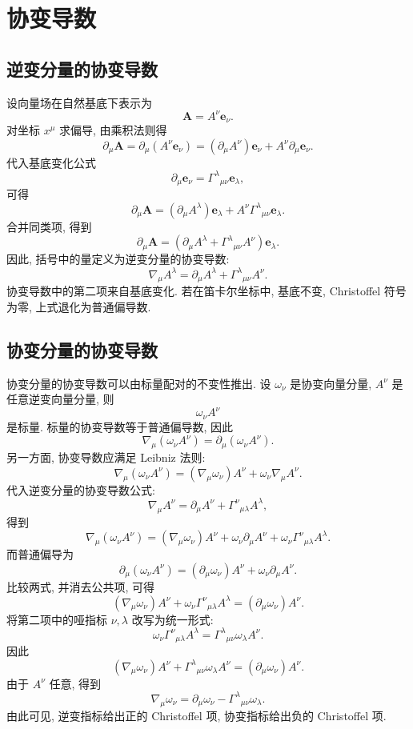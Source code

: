 \section{协变导数}

\subsection{逆变分量的协变导数}

设向量场在自然基底下表示为
\[
\bm{A}
=
A^{\nu}\bm{e}_{\nu}.
\]
对坐标 $x^{\mu}$ 求偏导, 由乘积法则得
\[
\partial_{\mu}\bm{A}
=
\partial_{\mu}(A^{\nu}\bm{e}_{\nu})
=
(\partial_{\mu}A^{\nu})\bm{e}_{\nu}
+
A^{\nu}\partial_{\mu}\bm{e}_{\nu}.
\]
代入基底变化公式
\[
\partial_{\mu}\bm{e}_{\nu}
=
\Gamma^{\lambda}{}_{\mu\nu}\bm{e}_{\lambda},
\]
可得
\[
\partial_{\mu}\bm{A}
=
(\partial_{\mu}A^{\lambda})\bm{e}_{\lambda}
+
A^{\nu}\Gamma^{\lambda}{}_{\mu\nu}\bm{e}_{\lambda}.
\]
合并同类项, 得到
\[
\partial_{\mu}\bm{A}
=
\left(
\partial_{\mu}A^{\lambda}
+
\Gamma^{\lambda}{}_{\mu\nu}A^{\nu}
\right)\bm{e}_{\lambda}.
\]
因此, 括号中的量定义为逆变分量的协变导数: 
\begin{equation}
	\nabla_{\mu}A^{\lambda}
	=
	\partial_{\mu}A^{\lambda}
	+
	\Gamma^{\lambda}{}_{\mu\nu}A^{\nu}.
	\label{eq:2.7}
\end{equation}
协变导数中的第二项来自基底变化. 若在笛卡尔坐标中, 基底不变, Christoffel 符号为零, 上式退化为普通偏导数. 

\subsection{协变分量的协变导数}

协变分量的协变导数可以由标量配对的不变性推出. 设 $\omega_{\nu}$ 是协变向量分量, $A^{\nu}$ 是任意逆变向量分量, 则
\[
\omega_{\nu}A^{\nu}
\]
是标量. 标量的协变导数等于普通偏导数, 因此
\[
\nabla_{\mu}(\omega_{\nu}A^{\nu})
=
\partial_{\mu}(\omega_{\nu}A^{\nu}).
\]
另一方面, 协变导数应满足 Leibniz 法则: 
\[
\nabla_{\mu}(\omega_{\nu}A^{\nu})
=
(\nabla_{\mu}\omega_{\nu})A^{\nu}
+
\omega_{\nu}\nabla_{\mu}A^{\nu}.
\]
代入逆变分量的协变导数公式: 
\[
\nabla_{\mu}A^{\nu}
=
\partial_{\mu}A^{\nu}
+
\Gamma^{\nu}{}_{\mu\lambda}A^{\lambda},
\]
得到
\[
\nabla_{\mu}(\omega_{\nu}A^{\nu})
=
(\nabla_{\mu}\omega_{\nu})A^{\nu}
+
\omega_{\nu}\partial_{\mu}A^{\nu}
+
\omega_{\nu}\Gamma^{\nu}{}_{\mu\lambda}A^{\lambda}.
\]
而普通偏导为
\[
\partial_{\mu}(\omega_{\nu}A^{\nu})
=
(\partial_{\mu}\omega_{\nu})A^{\nu}
+
\omega_{\nu}\partial_{\mu}A^{\nu}.
\]
比较两式, 并消去公共项, 可得
\[
(\nabla_{\mu}\omega_{\nu})A^{\nu}
+
\omega_{\nu}\Gamma^{\nu}{}_{\mu\lambda}A^{\lambda}
=
(\partial_{\mu}\omega_{\nu})A^{\nu}.
\]
将第二项中的哑指标 $\nu,\lambda$ 改写为统一形式: 
\[
\omega_{\nu}\Gamma^{\nu}{}_{\mu\lambda}A^{\lambda}
=
\Gamma^{\lambda}{}_{\mu\nu}\omega_{\lambda}A^{\nu}.
\]
因此
\[
(\nabla_{\mu}\omega_{\nu})A^{\nu}
+
\Gamma^{\lambda}{}_{\mu\nu}\omega_{\lambda}A^{\nu}
=
(\partial_{\mu}\omega_{\nu})A^{\nu}.
\]
由于 $A^{\nu}$ 任意, 得到
\begin{equation}
	\nabla_{\mu}\omega_{\nu}
	=
	\partial_{\mu}\omega_{\nu}
	-
	\Gamma^{\lambda}{}_{\mu\nu}\omega_{\lambda}.
	\label{eq:2.8}
\end{equation}
由此可见, 逆变指标给出正的 Christoffel 项, 协变指标给出负的 Christoffel 项. 

